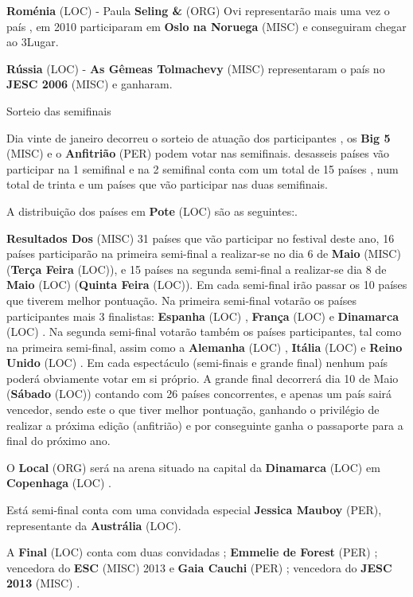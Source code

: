 \documentclass[12pt,a4paper]{article}
\begin{document}
\textbf{Roménia} (LOC) - Paula \textbf{Seling \&} (ORG) Ovi representarão mais uma vez o país , em 2010 participaram em \textbf{Oslo na Noruega} (MISC) e conseguiram chegar ao 3Lugar.

\textbf{Rússia} (LOC) - \textbf{As Gêmeas Tolmachevy} (MISC) representaram o país no \textbf{JESC 2006} (MISC) e ganharam.



Sorteio das semifinais

Dia vinte de janeiro decorreu o sorteio de atuação dos participantes , os \textbf{Big 5} (MISC) e o \textbf{Anfitrião} (PER) podem votar nas semifinais. desasseis países vão participar na 1 semifinal e na 2 semifinal conta com um total de 15 países , num total de trinta e um países que vão participar nas duas semifinais.

A distribuição dos países em \textbf{Pote} (LOC) são as seguintes:.



\textbf{Resultados Dos} (MISC) 31 países que vão participar no festival deste ano, 16 países participarão na primeira semi-final a realizar-se no dia 6 de \textbf{Maio} (MISC) (\textbf{Terça Feira} (LOC)), e 15 países na segunda semi-final a realizar-se dia 8 de \textbf{Maio} (LOC) (\textbf{Quinta Feira} (LOC)). Em cada semi-final irão passar os 10 países que tiverem melhor pontuação. Na primeira semi-final votarão os países participantes mais 3 finalistas: \textbf{Espanha} (LOC) , \textbf{França} (LOC) e \textbf{Dinamarca} (LOC) . Na segunda semi-final votarão também os países participantes, tal como na primeira semi-final, assim como a \textbf{Alemanha} (LOC) , \textbf{Itália} (LOC) e \textbf{Reino Unido} (LOC) . Em cada espectáculo (semi-finais e grande final) nenhum país poderá obviamente votar em si próprio. A grande final decorrerá dia 10 de Maio (\textbf{Sábado} (LOC)) contando com 26 países concorrentes, e apenas um país sairá vencedor, sendo este o que tiver melhor pontuação, ganhando o privilégio de realizar a próxima edição (anfitrião) e por conseguinte ganha o passaporte para a final do próximo ano.

O \textbf{Local} (ORG) será na arena situado na capital da \textbf{Dinamarca} (LOC) em \textbf{Copenhaga} (LOC) .

Está semi-final conta com uma convidada especial \textbf{Jessica Mauboy} (PER), representante da \textbf{Austrália} (LOC).

A \textbf{Final} (LOC) conta com duas convidadas ; \textbf{Emmelie de Forest} (PER) ; vencedora do \textbf{ESC} (MISC) 2013 e \textbf{Gaia Cauchi} (PER) ; vencedora do \textbf{JESC 2013} (MISC) .
\end{document}
